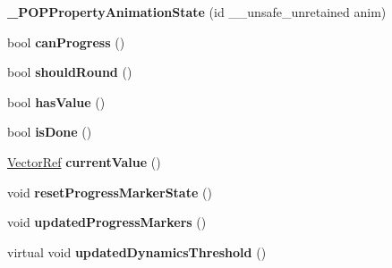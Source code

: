 \begin{DoxyCompactItemize}
\mbox{\label{struct___p_o_p_property_animation_state_a2db9bc7e6545036aad9bedb83d26cbb5}} 
{\bfseries \+\_\+\+P\+O\+P\+Property\+Animation\+State} (id \+\_\+\+\_\+unsafe\+\_\+unretained anim)
\item 
\mbox{\label{struct___p_o_p_property_animation_state_a6e78a082cb2b8c449f881580df7a932d}} 
bool {\bfseries can\+Progress} ()
\item 
\mbox{\label{struct___p_o_p_property_animation_state_a1cb7ff64b1d59dd4b994892ed7427ded}} 
bool {\bfseries should\+Round} ()
\item 
\mbox{\label{struct___p_o_p_property_animation_state_afc0f271a12a8e8bb9dba053edb9624a0}} 
bool {\bfseries has\+Value} ()
\item 
\mbox{\label{struct___p_o_p_property_animation_state_a2b53a2e063ee3fd9903cc2f17f53aaa7}} 
bool {\bfseries is\+Done} ()
\item 
\mbox{\label{struct___p_o_p_property_animation_state_a6405396c01ff7d574bd1f856d4601e81}} 
\mbox{\hyperlink{namespace_p_o_p_ae9f6819a2172ed569526091e357712f5}{Vector\+Ref}} {\bfseries current\+Value} ()
\item 
\mbox{\label{struct___p_o_p_property_animation_state_af564c4c8b5a8c3770a30d9e49e5021f4}} 
void {\bfseries reset\+Progress\+Marker\+State} ()
\item 
\mbox{\label{struct___p_o_p_property_animation_state_a521a1952536f708419f0f00e1cbb8b5b}} 
void {\bfseries updated\+Progress\+Markers} ()
\item 
\mbox{\label{struct___p_o_p_property_animation_state_aa57360422c9332c2328a2d1aa5f4aa45}} 
virtual void {\bfseries updated\+Dynamics\+Threshold} ()
\item 
\mbox{\label{struct___p_o_p_property_animation_state_ae09532bb611aa41153b5f582f17e6924}} 

\end{DoxyCompactItemize}
